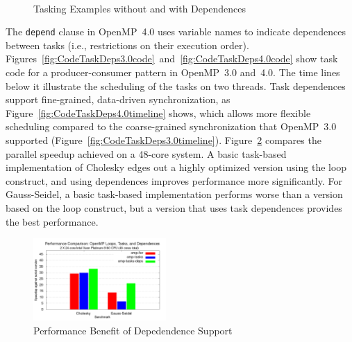 \begin{figure}
~
~
\caption{Tasking Examples without and with Dependences\label{fig:CodeTaskDeps}}
\end{figure}

The \texttt{depend} clause in OpenMP~4.0 uses variable names to indicate
dependences between tasks (i.e., restrictions on their execution order).
Figures~\ref{fig:CodeTaskDeps3.0code}~and~\ref{fig:CodeTaskDeps4.0code} show 
task code for a producer-consumer pattern in OpenMP~3.0 and~4.0.  The 
time lines below it illustrate the scheduling of the tasks on two threads.
Task dependences support fine-grained, data-driven synchronization, as 
Figure~\ref{fig:CodeTaskDeps4.0timeline} shows, which allows more flexible 
scheduling compared to the coarse-grained synchronization that OpenMP~3.0
supported (Figure~\ref{fig:CodeTaskDeps3.0timeline}). 
Figure~\ref{fig:dep-speedup} compares the parallel speedup achieved on a 
48-core system. A basic task-based implementation of Cholesky edges out a 
highly optimized version using the loop construct, and using dependences 
improves performance more significantly. For Gauss-Seidel, a basic task-based 
implementation performs worse than a version based on the loop construct, 
but a version that uses task dependences provides the best performance.

\begin{figure}
\includegraphics[width=0.45\textwidth]{pics/task-perf-results.png}
\caption{Performance Benefit of Depedendence Support}
\label{fig:dep-speedup}
\end{figure}

